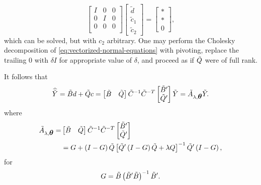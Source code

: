 \begin{equation} \label{eq:vectorized-normal-equations-cholesky-2}
\begin{bmatrix}
I & 0 & 0\\
0 & I & 0 \\
0 & 0 & 0 \\
\end{bmatrix}
\begin{bmatrix}
\tilde{d}\\
\tilde{c}_1\\
\tilde{c}_2
\end{bmatrix}
= \begin{bmatrix}
* \\
* \\
0
\end{bmatrix},
\end{equation}
\noindent
which can be solved, but with $c_2$ arbitrary. One may perform the Cholesky decomposition of \ref{eq:vectorized-normal-equations} with pivoting, replace the trailing $0$ with $\delta I$ for appropriate value of $\delta$, and proceed as if $\tilde{Q}$ were of full rank. 

\bigskip

It follows that
\begin{equation} \label{eq:tildeY-hat-equals-tildeA-tildeY}
\widehat{\tilde{Y}} = \tilde{B} d + \tilde{Q} c = \begin{bmatrix} \tilde{B} & \tilde{Q} \end{bmatrix} \tilde{C}^{-1} \tilde{C}^{-T} \begin{bmatrix} \tilde{B}' \\ \tilde{Q}' \end{bmatrix} \tilde{Y} = \tilde{A}_{\lambda,\mbox{\boldmath $\theta$}} \tilde{Y}.
\end{equation} 
\noindent
where
\begin{align}
\begin{split} \label{eq:smoothing-matrix-A-tilde}
\tilde{A}_{\lambda,\mbox{\boldmath $\theta$}} =& \begin{bmatrix} \tilde{B} & \tilde{Q} \end{bmatrix} \tilde{C}^{-1} \tilde{C}^{-T} \begin{bmatrix} \tilde{B}' \\ \tilde{Q}' \end{bmatrix}  \\
&= G + \left(I - G\right) \tilde{Q} \left[\tilde{Q}'\left( I - G \right)\tilde{Q} + \lambda Q\right]^{-1} \tilde{Q}'\left(I - G\right),
\end{split}
\end{align} 
\noindent
for
\[
G = \tilde{B}\left(\tilde{B}' \tilde{B} \right)^{-1}\tilde{B}'.
\]



